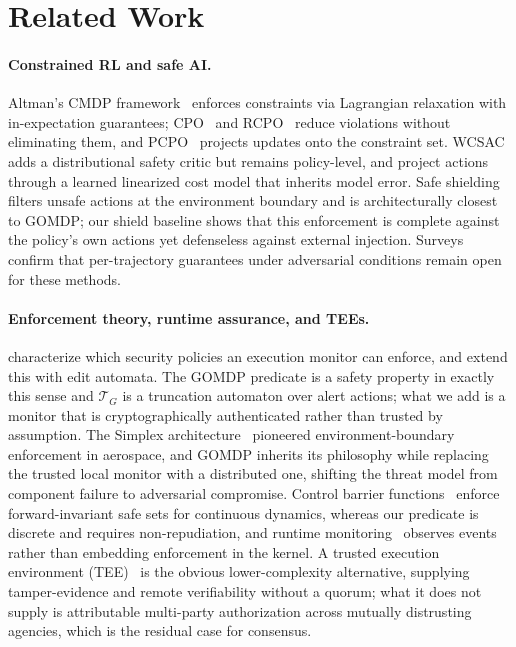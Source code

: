 \documentclass[letterpaper]{article} %
\newcommand{\calT}{\mathcal{T}}
\begin{document}
\section{Related Work}
\label{sec:related}

\paragraph{Constrained RL and safe AI.} Altman's CMDP framework~\citep{altman1999} enforces constraints via Lagrangian relaxation with in-expectation guarantees; CPO~\citep{achiam2017} and RCPO~\citep{tessler2019} reduce violations without eliminating them, and PCPO~\citep{yang2020pcpo} projects updates onto the constraint set. WCSAC~\citep{yang2021wcsac} adds a distributional safety critic but remains policy-level, and \citet{dalal2018} project actions through a learned linearized cost model that inherits model error. Safe shielding~\citep{alshiekh2018} filters unsafe actions at the environment boundary and is architecturally closest to GOMDP; our shield baseline shows that this enforcement is complete against the policy's own actions yet defenseless against external injection. Surveys~\citep{gu2022survey} confirm that per-trajectory guarantees under adversarial conditions remain open for these methods.

\paragraph{Enforcement theory, runtime assurance, and TEEs.} \citet{schneider2000} characterize which security policies an execution monitor can enforce, and \citet{ligatti2005} extend this with edit automata. The GOMDP predicate is a safety property in exactly this sense and $\calT_G$ is a truncation automaton over alert actions; what we add is a monitor that is cryptographically authenticated rather than trusted by assumption. The Simplex architecture~\citep{sha2001} pioneered environment-boundary enforcement in aerospace, and GOMDP inherits its philosophy while replacing the trusted local monitor with a distributed one, shifting the threat model from component failure to adversarial compromise. Control barrier functions~\citep{ames2019} enforce forward-invariant safe sets for continuous dynamics, whereas our predicate is discrete and requires non-repudiation, and runtime monitoring~\citep{leucker2009} observes events rather than embedding enforcement in the kernel. A trusted execution environment (TEE)~\citep{costan2016} is the obvious lower-complexity alternative, supplying tamper-evidence and remote verifiability without a quorum; what it does not supply is attributable multi-party authorization across mutually distrusting agencies, which is the residual case for consensus.
\end{document}
